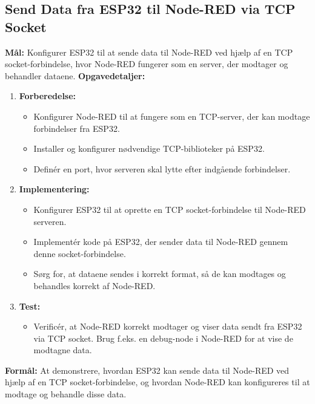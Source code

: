 \documentclass[12pt,a4paper]{book}
\begin{document}
	\subsection*{Send Data fra ESP32 til Node-RED via TCP Socket}
	\textbf{Mål:} Konfigurer ESP32 til at sende data til Node-RED ved hjælp af en TCP socket-forbindelse, hvor Node-RED fungerer som en server, der modtager og behandler dataene.
	\newline\newline\noindent
	\textbf{Opgavedetaljer:}
	\begin{enumerate}
		\item \textbf{Forberedelse:}
		\begin{itemize}
			\item Konfigurer Node-RED til at fungere som en TCP-server, der kan modtage forbindelser fra ESP32.
			\item Installer og konfigurer nødvendige TCP-biblioteker på ESP32.
			\item Definér en port, hvor serveren skal lytte efter indgående forbindelser.
		\end{itemize}
		\item \textbf{Implementering:}
		\begin{itemize}
			\item Konfigurer ESP32 til at oprette en TCP socket-forbindelse til Node-RED serveren.
			\item Implementér kode på ESP32, der sender data til Node-RED gennem denne socket-forbindelse.
			\item Sørg for, at dataene sendes i korrekt format, så de kan modtages og behandles korrekt af Node-RED.
		\end{itemize}
		\item \textbf{Test:}
		\begin{itemize}
			\item Verificér, at Node-RED korrekt modtager og viser data sendt fra ESP32 via TCP socket. Brug f.eks. en debug-node i Node-RED for at vise de modtagne data.
		\end{itemize}
	\end{enumerate}
	\textbf{Formål:} At demonstrere, hvordan ESP32 kan sende data til Node-RED ved hjælp af en TCP socket-forbindelse, og hvordan Node-RED kan konfigureres til at modtage og behandle disse data.
	
\end{document}
